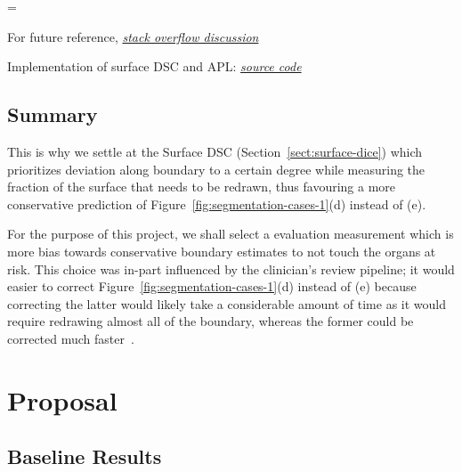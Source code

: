\documentclass[11pt,twoside]{report}
\newenvironment{warning}
  {\par\begin{mdframed}[linewidth=1pt,linecolor=black]%
    \begin{list}{}{\leftmargin=1cm
                   \labelwidth=\leftmargin}\item[\Large\ding{43}]}
  {\end{list}\end{mdframed}\par}
\begin{document}
\begin{warning}
  For future reference, \textit{\href{https://stackoverflow.com/questions/73286639/how-to-calculate-added-path-length-apl-image-segmentation-metric}{stack overflow discussion}}

  Implementation of surface DSC and APL: \textit{\href{https://github.com/pyplati/platipy/blob/master/platipy/imaging/label/comparison.py}{source code}}
\end{warning}

\section{Summary}

This is why we settle at the Surface DSC (Section~\ref{sect:surface-dice}) which prioritizes deviation along boundary to a certain degree while measuring the fraction of the surface that needs to be redrawn, thus favouring a more conservative prediction of Figure~\ref{fig:segmentation-cases-1}(d) instead of (e).

For the purpose of this project, we shall select a evaluation measurement which is more bias towards conservative boundary estimates to not touch the organs at risk. This choice was in-part influenced by the clinician's review pipeline; it would easier to correct Figure~\ref{fig:segmentation-cases-1}(d) instead of (e) because correcting the latter would likely take a considerable amount of time as it would require redrawing almost all of the boundary, whereas the former could be corrected much faster~\cite{Nikolov2021-xe}.


\chapter{Proposal}\label{sect:proposal}

\section{Baseline Results}\label{sect:baseline-results}
\end{document}
